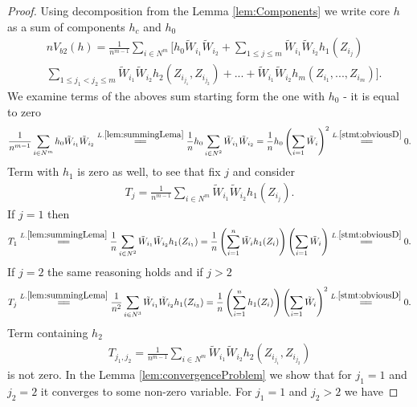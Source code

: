 \documentclass{article} %
\begin{document}
\begin{proof}
Using decomposition from the Lemma \ref{lem:Components} we write core  $h$ as a sum of components $h_c$ and $h_0$  
\begin{align}
\label{eq:bootstrapedOne}
 &n V_{b2}(h) = \frac{1} {n^{m-1}}  \sum_{i \in N^m}  \Big[h_0  \tilde W_{i_1} \tilde W_{i_2} + \sum_{1 \leq j \leq m } \tilde W_{i_1} \tilde W_{i_2} h_1(Z_{i_j})    \\ 
 &\sum_{1 \leq j_1 < j_2 \leq m } \tilde W_{i_1} \tilde W_{i_2} h_2(Z_{i_{j_1}},Z_{i_{j_2}}) + ... +  \tilde W_{i_1} \tilde W_{i_2}   h_m(Z_{i_1},...,Z_{i_m}) \Big].
\end{align}
We examine terms of the aboves sum starting form the one with $h_0$ - it is equal to zero
\begin{align}
\frac{1} {n^{m-1}}  \sum_{i \in N^m}  h_0  \tilde W_{i_1} \tilde W_{i_2}   \overset{L.\ref{lem:summingLema}}{=\joinrel=} \frac 1 n h_0 \sum_{i \in N^2} \tilde W_{i_1} \tilde W_{i_2} = \frac 1 n h_0 \left( \sum_{i=1} \tilde W_i \right)^2  \overset{L.\ref{stmt:obviousD}}{=\joinrel=} 0.
\end{align}  
Term with $h_1$ is zero as well, to see that fix $j$ and consider 
\begin{align}
T_{j} = \frac{1} {n^{m-1}}  \sum_{i \in N^m}  \tilde W_{i_1} \tilde W_{i_2} h_1(Z_{i_j}).  
\end{align}  
If $j=1$ then
\begin{align}
T_{1} \overset{L.\ref{lem:summingLema}}{=\joinrel=} \frac{1} {n}  \sum_{i \in N^2}  \tilde W_{i_1} \tilde W_{i_2} h_1(Z_{i_1}) =  \frac{1} {n}  \left( \sum_{i=1}^n  \tilde W_i h_1(Z_i) \right) \left( \sum_{i=1} \tilde W_i \right) \overset{L.\ref{stmt:obviousD}}{=\joinrel=} 0.
\end{align}
If $j=2$ the same reasoning holds and if $j>2$
\begin{align}
T_{j} \overset{L.\ref{lem:summingLema}}{=\joinrel=} \frac{1} {n^2}  \sum_{i \in N^3}  \tilde W_{i_1} \tilde W_{i_2} h_1(Z_{i_3}) =  \frac{1} {n}  \left( \sum_{i=1}^n h_1(Z_i) \right) \left( \sum_{i=1} \tilde W_i \right)^2 \overset{L.\ref{stmt:obviousD}}{=\joinrel=} 0.
\end{align}
Term containing $h_2$ 
\begin{align}
T_{j_1,j_2} = \frac{1} {n^{m-1}}  \sum_{i \in N^m}  \tilde W_{i_1} \tilde W_{i_2} h_2(Z_{i_{j_1}},Z_{i_{j_2}})
\end{align}
is not zero. In the Lemma \ref{lem:convergenceProblem}  we show that for $j_1=1$ and $j_2=2$ it  converges to some non-zero variable. For $j_1 = 1$ and $j_2 > 2$ we have

\end{proof}
\end{document}
